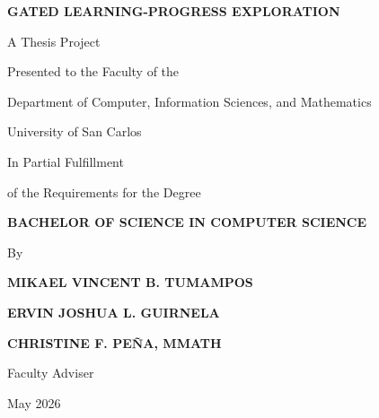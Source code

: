 \begin{titlepage}
\thispagestyle{empty}
\centering
\normalsize

{\bfseries GATED LEARNING-PROGRESS EXPLORATION\par}

\vfill

{A Thesis Project\par}
{Presented to the Faculty of the\par}
{Department of Computer, Information Sciences, and Mathematics\par}
{University of San Carlos\par}

\vfill

{In Partial Fulfillment\par}
{of the Requirements for the Degree\par}
{\bfseries BACHELOR OF SCIENCE IN COMPUTER SCIENCE\par}

\vfill

{By\par}
{\bfseries MIKAEL VINCENT B. TUMAMPOS\par}
{\bfseries ERVIN JOSHUA L. GUIRNELA\par}

\vfill

{\bfseries CHRISTINE F. PEÑA, MMATH\par}
{Faculty Adviser\par}

\vfill

{May 2026\par}
\end{titlepage}